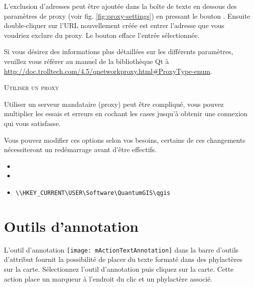L'exclusion d'adresses peut être ajoutée dans la boîte de texte en dessous des 
paramètres de proxy (voir fig. \ref{fig:proxy-settings}) en pressant le bouton 
. Ensuite double-cliquer sur l'URL nouvellement créée est 
entrer l'adresse que vous voudriez exclure du proxy. Le bouton  
efface l'entrée sélectionnée.

Si vous désirez des informations plus détaillées sur les différents paramètres, 
veuillez vous référer au manuel de la bibliothèque Qt à \url{http://doc.trolltech.com/4.5/qnetworkproxy.html#ProxyType-enum}.

\begin{Tip} \caption{\textsc{Utiliser un proxy}}
Utiliser un serveur mandataire (proxy) peut être compliqué, vous pouvez multiplier 
les essais et erreurs en cochant les cases jusqu'à obtenir une connexion qui vous 
satisfasse.
\end{Tip}

Vous pouvez modifier ces options selon vos besoins, certains de ces changements 
nécessiteront un redémarrage avant d'être effectifs.

\begin{itemize}[label=--]
\item {}
\item {}
\item {}
\begin{verbatim}
\\HKEY_CURRENT\USER\Software\QuantumGIS\qgis
\end{verbatim}
\end{itemize}

\section{Outils d'annotation} \label{sec:annotations}

L'outil d'annotation \texttt{[image: mActionTextAnnotation]} 
dans la barre d'outils d'attribut fournit la possibilité de placer du texte formaté 
dans des phylactères sur la carte. Sélectionnez l'outil d'annotation puis cliquez 
sur la carte. Cette action place un marqueur à l'endroit du clic et un phylactère 
associé.

